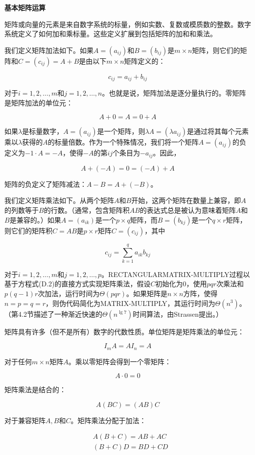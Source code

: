 \documentclass[lang=cn,newtx,10pt,scheme=chinese]{elegantbook}
\begin{document}
\textbf{基本矩阵运算}

矩阵或向量的元素是来自数字系统的标量，例如实数、复数或模质数的整数。数字系统定义了如何加和乘标量。这些定义扩展到包括矩阵的加和和乘法。

我们定义矩阵加法如下。如果$A=(a_{i j})$和$B=(b_{i j})$是$m \times n$矩阵，则它们的矩阵和$C=(c_{i j})=A+B$是由以下$m \times n$矩阵定义的：

$$
c_{i j}=a_{i j}+b_{i j}
$$

对于$i=1,2, \ldots, m$和$j=1,2, \ldots, n$。也就是说，矩阵加法是逐分量执行的。零矩阵是矩阵加法的单位元：

$$
A+0=A=0+A
$$

如果$\lambda$是标量数字，$A=(a_{i j})$是一个矩阵，则$\lambda A=(\lambda a_{i j})$是通过将其每个元素乘以$\lambda$获得的$A$的标量倍数。作为一个特殊情况，我们将一个矩阵$A=(a_{i j})$的负定义为$-1 \cdot A=-A$，使得$-A$的第$i j$个条目为$-a_{i j}$。因此，

$$
A+(-A)=0=(-A)+A
$$

矩阵的负定义了矩阵减法：$A-B=A+(-B)$。

我们定义矩阵乘法如下。从两个矩阵$A$和$B$开始，这两个矩阵在数量上兼容，即$A$的列数等于$B$的行数。（通常，包含矩阵积$AB$的表达式总是被认为意味着矩阵$A$和$B$是兼容的。）如果$A=(a_{i k})$是一个$p \times q$矩阵，而$B=(b_{k j})$是一个$q \times r$矩阵，则它们的矩阵积$C=AB$是$p \times r$矩阵$C=(c_{i j})$，其中

$$
c_{i j}=\sum_{k=1}^q a_{i k} b_{k j}
$$

对于$i=1,2, \ldots, m$和$j=1,2, \ldots, p$。RECTANGULARMATRIX-MULTIPLY过程以基于方程式(D.2)的直接方式实现矩阵乘法，假设$C$初始化为0，使用$p q r$次乘法和$p(q-1) r$次加法，运行时间为$\Theta(p q r)$。如果矩阵是$n \times n$方阵，使得$n=p=q=r$，则伪代码简化为MATRIX-MULTIPLY，其运行时间为$\Theta(n^3)$。（第4.2节描述了一种渐近快速的$\Theta(n^{\lg 7})$时间算法，由Strassen提出。）

矩阵具有许多（但不是所有）数字的代数性质。单位矩阵是矩阵乘法的单位元：

$$
I_m A=A I_n=A
$$

对于任何$m \times n$矩阵$A$。乘以零矩阵会得到一个零矩阵：

$$
A \cdot 0=0
$$

矩阵乘法是结合的：

$$
A(B C)=(A B) C
$$

对于兼容矩阵$A, B$和$C$。矩阵乘法分配于加法：

$$
\begin{aligned}
& A(B+C)=A B+A C \\
& (B+C) D=B D+C D
\end{aligned}
$$
\end{document}
